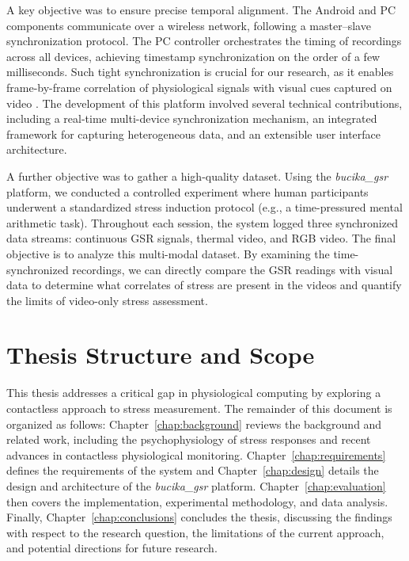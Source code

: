 A key objective was to ensure precise temporal alignment. The Android and PC components communicate over a wireless network, following a master--slave synchronization protocol. The PC controller orchestrates the timing of recordings across all devices, achieving timestamp synchronization on the order of a few milliseconds. Such tight synchronization is crucial for our research, as it enables frame-by-frame correlation of physiological signals with visual cues captured on video \cite{Gravina2017}. The development of this platform involved several technical contributions, including a real-time multi-device synchronization mechanism, an integrated framework for capturing heterogeneous data, and an extensible user interface architecture.

A further objective was to gather a high-quality dataset. Using the \textit{bucika\_gsr} platform, we conducted a controlled experiment where human participants underwent a standardized stress induction protocol (e.g., a time-pressured mental arithmetic task). Throughout each session, the system logged three synchronized data streams: continuous GSR signals, thermal video, and RGB video. The final objective is to analyze this multi-modal dataset. By examining the time-synchronized recordings, we can directly compare the GSR readings with visual data to determine what correlates of stress are present in the videos and quantify the limits of video-only stress assessment.

\section{Thesis Structure and Scope}
\label{sec:intro_structure}

This thesis addresses a critical gap in physiological computing by exploring a contactless approach to stress measurement. The remainder of this document is organized as follows: Chapter~\ref{chap:background} reviews the background and related work, including the psychophysiology of stress responses and recent advances in contactless physiological monitoring. Chapter~\ref{chap:requirements} defines the requirements of the system and Chapter~\ref{chap:design} details the design and architecture of the \textit{bucika\_gsr} platform. Chapter~\ref{chap:evaluation} then covers the implementation, experimental methodology, and data analysis. Finally, Chapter~\ref{chap:conclusions} concludes the thesis, discussing the findings with respect to the research question, the limitations of the current approach, and potential directions for future research.